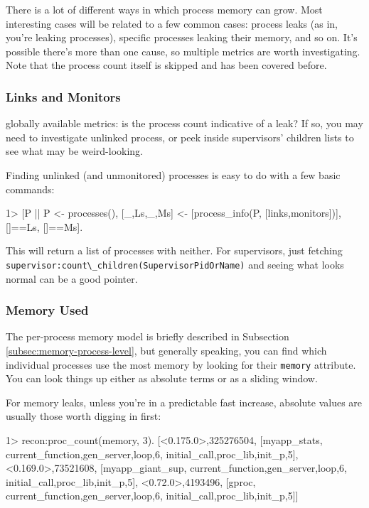 \documentclass[11pt, oneside]{book}   	%
\newcommand{\expression}[1]{\Verb`#1`}
\newcommand{\term}[1]{\Verb`#1`}
\begin{document}
There is a lot of different ways in which process memory can grow. Most interesting cases will be related to a few common cases: process leaks (as in, you're leaking processes), specific processes leaking their memory, and so on. It's possible there's more than one cause, so multiple metrics are worth investigating. Note that the process count itself is skipped and has been covered before.

\subsubsection{Links and Monitors}

globally available metrics: is the process count indicative of a leak? If so, you may need to investigate unlinked process, or peek inside supervisors' children lists to see what may be weird-looking.

Finding unlinked (and unmonitored) processes is easy to do with a few basic commands:

\begin{VerbatimEshell}
1> [P || P <- processes(),
         [{_,Ls},{_,Ms}] <- [process_info(P, [links,monitors])],
         []==Ls, []==Ms].
\end{VerbatimEshell}

This will return a list of processes with neither. For supervisors, just fetching \expression{supervisor:count\_children(SupervisorPidOrName)} and seeing what looks normal can be a good pointer.


\subsubsection{Memory Used}

The per-process memory model is briefly described in Subsection \ref{subsec:memory-process-level}, but generally speaking, you can find which individual processes use the most memory by looking for their \term{memory} attribute. You can look things up either as absolute terms or as a sliding window.

For memory leaks, unless you're in a predictable fast increase, absolute values are usually those worth digging in first:

\begin{VerbatimEshell}
1> recon:proc_count(memory, 3).
[{<0.175.0>,325276504,
  [myapp_stats,
   {current_function,{gen_server,loop,6}},
   {initial_call,{proc_lib,init_p,5}}]},
 {<0.169.0>,73521608,
  [myapp_giant_sup,
   {current_function,{gen_server,loop,6}},
   {initial_call,{proc_lib,init_p,5}}]},
 {<0.72.0>,4193496,
  [gproc,
   {current_function,{gen_server,loop,6}},
   {initial_call,{proc_lib,init_p,5}}]}]
\end{VerbatimEshell}
\end{document}
